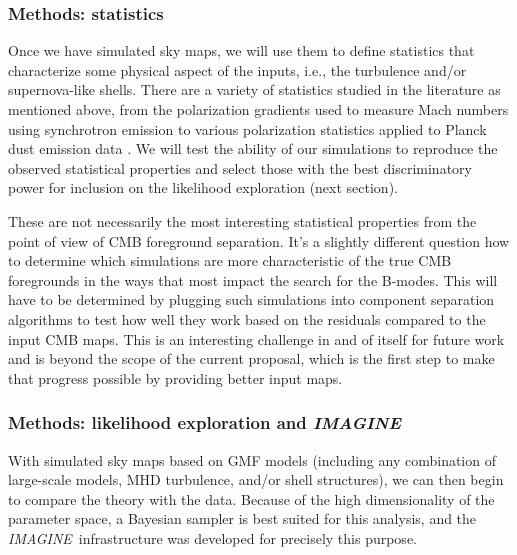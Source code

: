 \documentclass[12pt]{article}
\newcommand{\imagine}{\textsl{IMAGINE}}
\newcommand{\imagineSW}{\textsl{IMAGINE}}
\begin{document}
\subsubsection*{Methods:  statistics}

Once we have simulated sky maps, we will use them to define statistics that characterize some physical aspect of the inputs, i.e., the turbulence and/or supernova-like shells.  There are a variety of statistics studied in the literature as mentioned above, from the polarization gradients used to measure Mach numbers using synchrotron emission \citep{Burkhart:2012} to various polarization statistics applied to Planck dust emission data \citep{pipXX,pipXXXIII}.  We will test the ability of our simulations to reproduce the observed statistical properties and select those with the best discriminatory power for inclusion on the likelihood exploration (next section).  

These are not necessarily the most interesting statistical properties from the point of view of CMB foreground separation.  It's a slightly different question how to determine which simulations are more characteristic of the true CMB foregrounds in the ways that most impact the search for the B-modes.  This will have to be determined by plugging such simulations into component separation algorithms to test how well they work based on the residuals compared to the input CMB maps.  This is an interesting challenge in and of itself for future work and is beyond the scope of the current proposal, which is the first step to make that progress possible by providing better input maps.  


\subsubsection*{Methods:  likelihood exploration and \imagineSW\ }

With simulated sky maps based on GMF models (including any combination of large-scale models, MHD turbulence, and/or shell structures), we can then begin to compare the theory with the data. Because of the high dimensionality of the parameter space, a Bayesian sampler is best suited for this analysis, and the \imagine\ infrastructure was developed for precisely this purpose.  
\end{document}
